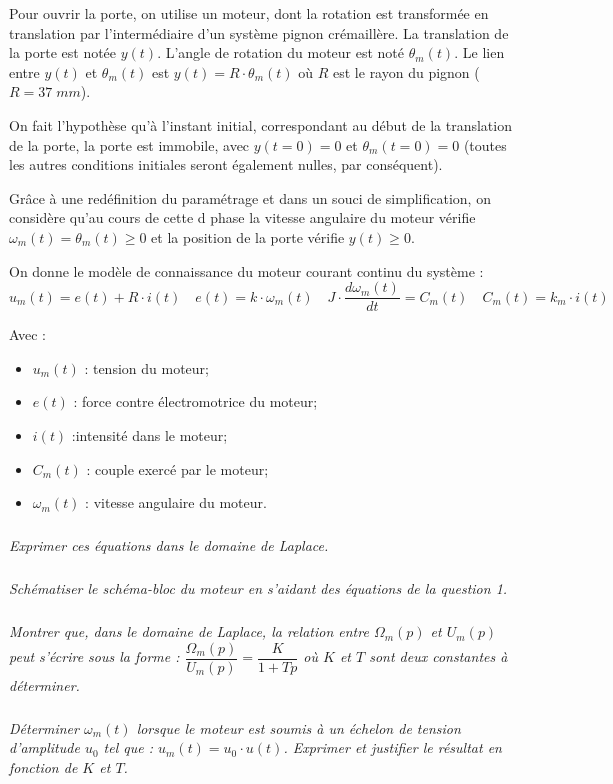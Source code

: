 \documentclass[10pt]{article}
\begin{document}
Pour ouvrir la porte, on utilise un moteur, dont la rotation est transformée en translation par l'intermédiaire d'un système pignon crémaillère. La translation de la porte est notée $y(t)$. L'angle de rotation du moteur est noté $\theta_m(t)$. Le lien entre $y(t)$ et $\theta_m (t)$ est $y(t) = R\cdot\theta_m (t)$ où $R$ est le rayon du pignon ($R=37\; mm$).

On fait l'hypothèse qu'à l'instant initial, correspondant au début de la translation de la porte, la porte est immobile, avec $y(t=0)=0$ et $\theta_m (t=0)=0$ (toutes les autres conditions initiales seront également nulles, par conséquent).

Grâce à une redéfinition du paramétrage et dans un souci de simplification, on considère qu'au cours de cette d phase la vitesse angulaire du moteur vérifie $\omega_m (t) = \theta_m (t) \geq 0$ et la position de la porte vérifie $y(t) \geq 0$.  


On donne le modèle de connaissance du moteur courant continu du système :
$$u_m(t) = e(t) + R\cdot i(t) 
\quad e(t) = k\cdot \omega_m(t) 
\quad J\cdot \dfrac{d\omega_m(t)}{dt} = C_m (t)
\quad C_m (t) = k_m \cdot i(t)$$

Avec : 
\begin{itemize}
\item $u_m (t)$ : tension du moteur; 
\item $e(t)$ : force contre électromotrice du moteur; 
\item $i(t)$ :intensité dans le moteur;
\item $C_m (t)$ : couple exercé par le moteur;
\item $\omega_m(t)$ : vitesse angulaire du moteur.
\end{itemize}


\subparagraph{}
\textit{Exprimer ces équations dans le domaine de Laplace.}

\subparagraph{}
\textit{Schématiser le schéma-bloc du moteur en s’aidant des équations de la question 1.}

\subparagraph{}
\textit{Montrer que, dans le domaine de Laplace, la relation entre $\Omega_m (p)$ et $U_m (p)$ peut s'écrire sous la forme : $\dfrac{\Omega_m(p)}{U_m(p)} = \dfrac{K}{1+Tp} $ où $K$ et $T$ sont deux constantes à déterminer.}

\subparagraph{}
\textit{Déterminer $\omega_m (t)$ lorsque le moteur est soumis à un échelon de tension d'amplitude $u_0$ tel que : $u_m (t)= u_0 \cdot u(t)$. Exprimer et justifier le résultat en fonction de $K$ et $T$.}
\end{document}

